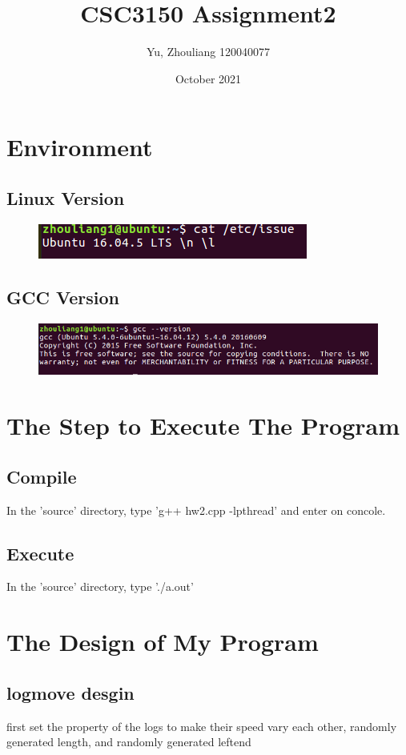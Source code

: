 \documentclass{article}
\title{CSC3150 Assignment2}
\author{Yu, Zhouliang 120040077 }
\date{October 2021}
\begin{document}
\maketitle

\section{Environment}
\subsection{Linux Version}
\begin{figure}[htbp]
    \centering
    \includegraphics{Linux.png}
\end{figure}
\subsection{GCC Version}
\begin{figure}[htbp]
    \centering
    \includegraphics{GCC.png}
\end{figure}

\section{The Step to Execute The Program}
\subsection{Compile}
In the 'source' directory, type 'g++ hw2.cpp -lpthread' and enter on concole.
\subsection{Execute}
In the 'source' directory, type './a.out'

\section{The Design of My Program }
\subsection{logmove desgin}
first set the property of the logs
to make their speed vary each other, randomly generated length,
and randomly generated leftend
\end{document}
